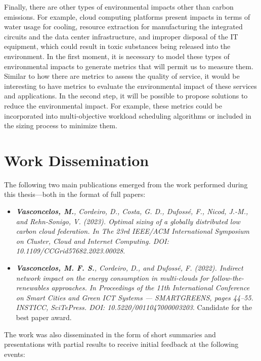 Finally, there are other types of environmental impacts other than carbon emissions. For example, cloud computing platforms present impacts in terms of water usage for cooling, resource extraction for manufacturing the integrated circuits and the data center infrastructure, and improper disposal of the IT equipment, which could result in toxic substances being released into the environment. In the first moment, it is necessary to model these types of environmental impacts to generate metrics that will permit us to measure them. Similar to how there are metrics to assess the quality of service, it would be interesting to have metrics to evaluate the environmental impact of these services and applications. In the second step, it will be possible to propose solutions to reduce the environmental impact. For example, these metrics could be incorporated into multi-objective workload scheduling algorithms or included in the sizing process to minimize them.

\section{Work Dissemination}

\label{sec:conclusion_dissemination}

The following two main publications emerged from the work performed during this thesis---both in the format of full papers:

\begin{itemize}

\item  \textit{\textbf{Vasconcelos, M.}, Cordeiro, D., Costa, G. D., Dufossé, F., Nicod, J.-M., and Rehn-Sonigo, V. (2023). Optimal sizing of a globally distributed low carbon cloud federation. In The 23rd IEEE/ACM International Symposium on Cluster, Cloud and Internet Computing. DOI: 10.1109/CCGrid57682.2023.00028}.
  
\item  \textit{\textbf{Vasconcelos, M. F. S.}, Cordeiro, D., and Dufossé, F. (2022). Indirect network impact on the energy consumption in multi-clouds for follow-the-renewables approaches. In Proceedings of the 11th International Conference on Smart Cities and Green ICT Systems — SMARTGREENS, pages 44–55. INSTICC, SciTePress. DOI: 10.5220/0011047000003203}. Candidate for the best paper award.

\end{itemize}

The work was also disseminated in the form of short summaries and presentations with partial results to receive initial feedback at the following events:

